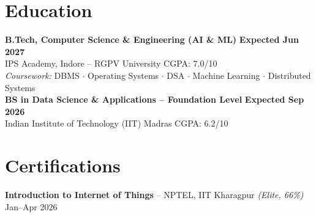 \documentclass[letterpaper,11pt]{article}
\begin{document}
\section{Education}
\textbf{B.Tech, Computer Science \& Engineering (AI \& ML)} \hfill \textbf{Expected Jun 2027} \\
IPS Academy, Indore -- RGPV University \hfill CGPA: 7.0/10 \\
\textit{Coursework:} DBMS $\cdot$ Operating Systems $\cdot$ DSA $\cdot$ Machine Learning $\cdot$ Distributed Systems \\[3pt]
\textbf{BS in Data Science \& Applications -- Foundation Level} \hfill \textbf{Expected Sep 2026} \\
Indian Institute of Technology (IIT) Madras \hfill CGPA: 6.2/10

\section{Certifications}
\textbf{Introduction to Internet of Things} -- NPTEL, IIT Kharagpur \textit{(Elite, 66\%)} \hfill Jan--Apr 2026
\end{document}
